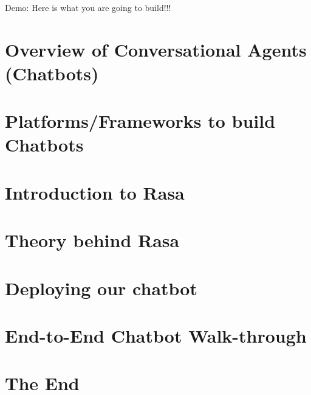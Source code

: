 \begin{frame}[fragile]\frametitle{}
\begin{center}
{\Large Demo: Here is what you are going to build!!!}

\end{center}
\end{frame}

\section[Overview]{Overview of Conversational Agents (Chatbots)}


\section[Platforms]{Platforms/Frameworks to build Chatbots}



\section[Intro]{Introduction to Rasa}



\section[Theory]{Theory behind Rasa}



% 
% 

% 
% 

\section[Deploy]{Deploying our chatbot}


\section[Zomato]{End-to-End Chatbot Walk-through}


\section[End]{The End}

